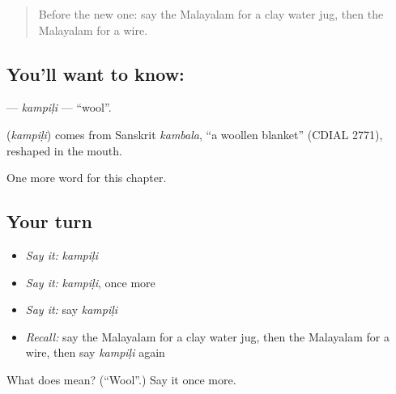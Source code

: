 \label{lesson:ML-C331-kampili}



\begin{quote}
Before the new one: say the Malayalam for a clay water jug, then the Malayalam for a wire.
\end{quote}

\subsection*{You'll want to know: }
\textbf{} — \emph{kampiḷi} — \textquotedblleft{}wool\textquotedblright{}.

\begin{cousinweb}
\textbf{} (\emph{kampiḷi}) comes from Sanskrit \emph{kambala}, \textquotedblleft{}a woollen blanket\textquotedblright{} (CDIAL 2771), reshaped in the mouth.
\end{cousinweb}

\begin{grammarlens}[title={What you've built}]
One more word for this chapter.
\end{grammarlens}

\subsection*{Your turn}
\begin{itemize}
\raggedright
  \item \emph{Say it:} \emph{kampiḷi}
  \item \emph{Say it:} \emph{kampiḷi}, once more
  \item \emph{Say it:} say \emph{kampiḷi}
  \item \emph{Recall:} say the Malayalam for a clay water jug, then the Malayalam for a wire, then say \emph{kampiḷi} again
\end{itemize}

\begin{tcolorbox}[breakable,colback=teal!4,colframe=teal!35!black,title={Before you move on}]
What does  mean? (\textquotedblleft{}Wool\textquotedblright{}.) Say it once more.
\end{tcolorbox}
